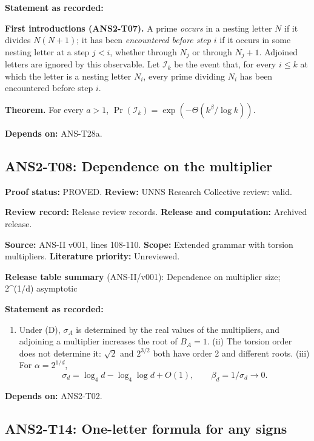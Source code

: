\documentclass[
  11pt,
]{article}
\providecommand{\tightlist}{%
  \setlength{\itemsep}{0pt}\setlength{\parskip}{0pt}}
\begin{document}
\textbf{Statement as recorded:}

\textbf{First introductions (ANS2-T07).} A prime \emph{occurs} in a
nesting letter \(N\) if it divides \(N(N+1)\); it has been
\emph{encountered before step \(i\)} if it occurs in some nesting letter
at a step \(j<i\), whether through \(N_j\) or through \(N_j+1\).
Adjoined letters are ignored by this observable. Let \(\mathcal I_k\) be
the event that, for every \(i\le k\) at which the letter is a nesting
letter \(N_i\), every prime dividing \(N_i\) has been encountered before
step \(i\).

\textbf{Theorem.} For every \(a>1\),
\(\Pr(\mathcal I_k)=\exp(-\Theta(k^\beta/\log k))\).

\textbf{Depends on:} ANS-T28a.

\hypertarget{ans2-t08-dependence-on-the-multiplier}{%
\subsection{ANS2-T08: Dependence on the
multiplier}\label{ans2-t08-dependence-on-the-multiplier}}

\textbf{Proof status:} PROVED. \textbf{Review:} UNNS Research Collective
review: valid.

\textbf{Review record:} Release review records. \textbf{Release and
computation:} Archived release.

\textbf{Source:} ANS-II v001, lines 108-110. \textbf{Scope:} Extended
grammar with torsion multipliers. \textbf{Literature priority:}
Unreviewed.

\textbf{Release table summary} (ANS-II/v001): Dependence on multiplier
size; 2\^{}(1/d) asymptotic

\textbf{Statement as recorded:}

\begin{enumerate}
\def\labelenumi{(\roman{enumi})}
\tightlist
\item
  Under (D), \(\sigma_A\) is determined by the real values of the
  multipliers, and adjoining a multiplier increases the root of
  \(B_A=1\). (ii) The torsion order does not determine it: \(\sqrt2\)
  and \(2^{3/2}\) both have order 2 and different roots. (iii) For
  \(\alpha=2^{1/d}\),
  \[\sigma_d=\log_4d-\log_4\log d+O(1),\qquad\beta_d=1/\sigma_d\to0 .\]
\end{enumerate}

\textbf{Depends on:} ANS2-T02.

\hypertarget{ans2-t14-one-letter-formula-for-any-signs}{%
\subsection{ANS2-T14: One-letter formula for any
signs}\label{ans2-t14-one-letter-formula-for-any-signs}}
\end{document}
